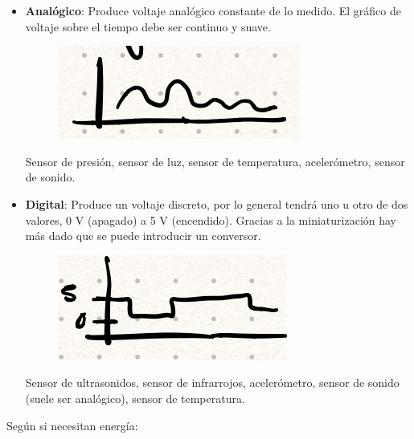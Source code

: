 \documentclass[12pt, twoside, openright]{report} %
\begin{document}
\begin{itemize}
	\item \textbf{Analógico}: Produce voltaje analógico constante de lo medido.
	      El gráfico de voltaje sobre el tiempo debe ser continuo y suave.

	      \begin{figure}[H]
		      {\includegraphics[scale=.5]{image-20210307210139988.png}}
	      \end{figure}
	      \vspace{-0.5cm}
	      Sensor de presión, sensor de luz, sensor de temperatura,
	      acelerómetro, sensor de sonido.
	\item \textbf{Digital}: Produce un voltaje discreto, por lo general tendrá
	      uno u otro de dos valores, 0 V (apagado) a 5 V (encendido). Gracias a la
	      miniaturización hay más dado que se puede introducir un conversor.

	      \begin{figure}[H]
		      {\includegraphics[scale=.5]{image-20210307210421078.png}}
	      \end{figure}
	      \vspace{-0.5cm}
	      Sensor de ultrasonidos, sensor de infrarrojos, acelerómetro, sensor
	      de sonido (suele ser analógico), sensor de temperatura.
\end{itemize}

Según si necesitan energía:
\end{document}
